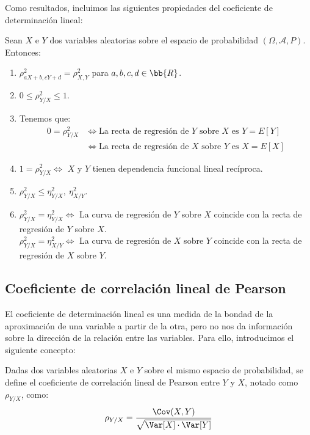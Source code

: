 Como resultados, incluimos las siguientes propiedades del coeficiente de determinación lineal:
\begin{prop}
    Sean $X$ e $Y$ dos variables aleatorias sobre el espacio de probabilidad $(\Omega, \mathcal{A}, P)$. Entonces:
    \begin{enumerate}

        \item $\rho_{aX+b,cY+d}^2 = \rho_{X,Y}^2$ para $a,b,c,d\in\bb{R}$.
        \item $0\leq \rho_{Y/X}^2 \leq 1$.
        \item Tenemos que:
        \begin{align*}
            0 = \rho_{Y/X}^2 &\iff \text{La recta de regresión de } Y \text{ sobre } X \text{ es } Y = E[Y]\\
            & \iff \text{La recta de regresión de } X \text{ sobre } Y \text{ es } X = E[X]
        \end{align*}

        \item $1=\rho_{Y/X}^2 \iff$ $X$ y $Y$ tienen dependencia funcional lineal recíproca.
        
        \item $\rho_{Y/X}^2 \leq \eta_{Y/X}^2,~\eta_{X/Y}^2$.
        
        \item $\rho_{Y/X}^2 = \eta_{Y/X}^2 \iff$ La curva de regresión de $Y$ sobre $X$ coincide con la recta de regresión de $Y$ sobre $X$.\\
        $\rho_{Y/X}^2 = \eta_{X/Y}^2 \iff$ La curva de regresión de $X$ sobre $Y$ coincide con la recta de regresión de $X$ sobre $Y$.
    \end{enumerate}
\end{prop}

\subsection{Coeficiente de correlación lineal de Pearson}

El coeficiente de determinación lineal es una medida de la bondad de la aproximación de una variable a partir de la otra, pero no nos da información sobre la dirección de la relación entre las variables. Para ello, introducimos el siguiente concepto:
\begin{definicion}
    Dadas dos variables aleatorias $X$ e $Y$ sobre el mismo espacio de probabilidad, se define el coeficiente de correlación lineal de Pearson entre $Y$ y $X$, notado como $\rho_{Y/X}$, como:
    \begin{equation*}
        \rho_{Y/X} = \dfrac{\Cov(X,Y)}{\sqrt{\Var[X]\cdot \Var[Y]}}
    \end{equation*}
\end{definicion}

